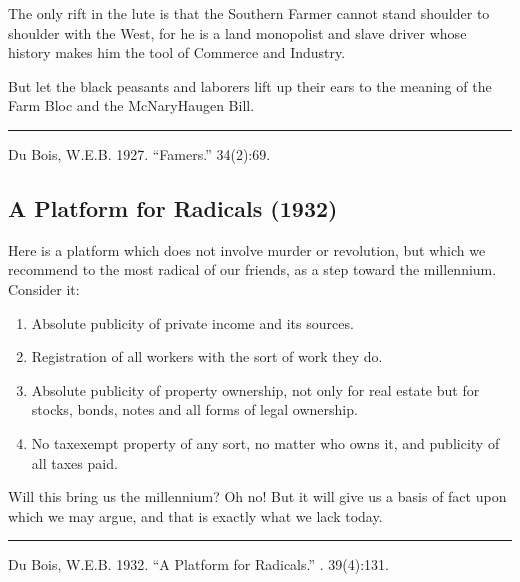 \documentclass[letterpaper,10pt,english]{jupyterBook}
\begin{document}
\sphinxAtStartPar
The only rift in the lute is that the Southern Farmer cannot stand shoulder to shoulder with the West, for he is a land monopolist and slave driver whose history makes him the tool of Commerce and Industry.

\sphinxAtStartPar
But let the black peasants and laborers lift up their ears to the meaning of the Farm Bloc and the McNary\sphinxhyphen{}Haugen Bill.


\bigskip\hrule\bigskip


\sphinxAtStartPar
{} Du Bois, W.E.B. 1927. “Famers.”  34(2):69.


\subsection{A Platform for Radicals (1932)}
\label{\detokenize{Volumes/39/04/platform_for_radicals:a-platform-for-radicals-1932}}\label{\detokenize{Volumes/39/04/platform_for_radicals::doc}}
\sphinxAtStartPar
Here is a platform which does not involve murder or revolution, but which we recommend to the most radical of our friends, as a step toward the millennium. Consider it:
\begin{enumerate}
%
\item {} 
\sphinxAtStartPar
Absolute publicity of private income and its sources.

\item {} 
\sphinxAtStartPar
Registration of all workers with the sort of work they do.

\item {} 
\sphinxAtStartPar
Absolute publicity of property ownership, not only for real estate but for stocks, bonds, notes and all forms of legal ownership.

\item {} 
\sphinxAtStartPar
No tax\sphinxhyphen{}exempt property of any sort, no matter who owns it, and publicity of all taxes paid.

\end{enumerate}

\sphinxAtStartPar
Will this bring us the millennium? Oh no! But it will give us a basis of fact upon which we may argue, and that is exactly what we lack today.


\bigskip\hrule\bigskip


\sphinxAtStartPar
{} Du Bois, W.E.B. 1932. “A Platform for Radicals.” . 39(4):131.
\end{document}
